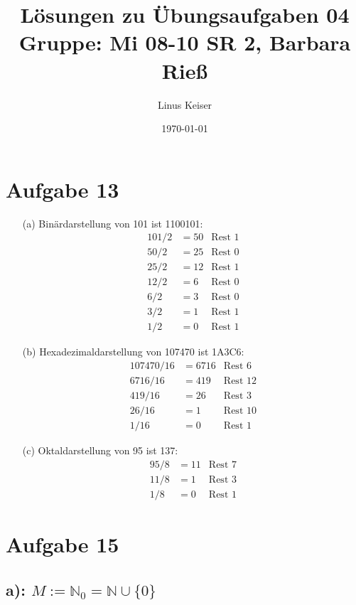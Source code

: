 \documentclass{article}
\title{Lösungen zu Übungsaufgaben 04 \\ \small Gruppe: Mi 08-10 SR 2, Barbara Rieß}
\author{Linus Keiser}
\date{\today}
\theoremstyle{definition}
\theoremstyle{remark}
\begin{document}
\maketitle

\section*{Aufgabe 13}

\begin{enumerate}
	\item[(a)] Binärdarstellung von 101 ist 1100101:
		\[
			\begin{aligned}
				101 / 2 & = 50 & \text{Rest } 1 \\
				50 / 2  & = 25 & \text{Rest } 0 \\
				25 / 2  & = 12 & \text{Rest } 1 \\
				12 / 2  & = 6  & \text{Rest } 0 \\
				6 / 2   & = 3  & \text{Rest } 0 \\
				3 / 2   & = 1  & \text{Rest } 1 \\
				1 / 2   & = 0  & \text{Rest } 1
			\end{aligned}
		\]
	\item[(b)] Hexadezimaldarstellung von 107470 ist 1A3C6:
		\[
			\begin{aligned}
				107470 / 16 & = 6716 & \text{Rest } 6  \\
				6716 / 16   & = 419  & \text{Rest } 12 \\
				419 / 16    & = 26   & \text{Rest } 3  \\
				26 / 16     & = 1    & \text{Rest } 10 \\
				1 / 16      & = 0    & \text{Rest } 1
			\end{aligned}
		\]
	\item[(c)] Oktaldarstellung von 95 ist 137:
		\[
			\begin{aligned}
				95 / 8 & = 11 & \text{Rest } 7 \\
				11 / 8 & = 1  & \text{Rest } 3 \\
				1 / 8  & = 0  & \text{Rest } 1
			\end{aligned}
		\]
\end{enumerate}


\section*{Aufgabe 15}

\subsection*{a): \( M := \mathbb{N}_0 = \mathbb{N} \cup \{0\} \)}
\end{document}
